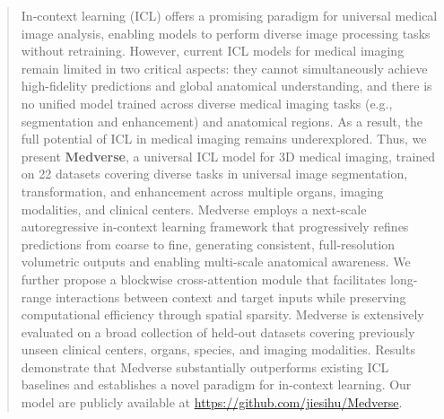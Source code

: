 
\begin{abstract}
In-context learning (ICL) offers a promising paradigm for universal medical image analysis, enabling models to perform diverse image processing tasks without retraining. However, current ICL models for medical imaging remain limited in two critical aspects: they cannot simultaneously achieve high-fidelity predictions and global anatomical understanding, and there is no unified model trained across diverse medical imaging tasks (e.g., segmentation and enhancement) and anatomical regions. As a result, the full potential of ICL in medical imaging remains underexplored. Thus, we present \textbf{Medverse}, a universal ICL model for 3D medical imaging, trained on 22 datasets covering diverse tasks in universal image segmentation, transformation, and enhancement across multiple organs, imaging modalities, and clinical centers. Medverse employs a next-scale autoregressive in-context learning framework that progressively refines predictions from coarse to fine, generating consistent, full-resolution volumetric outputs and enabling multi-scale anatomical awareness. We further propose a blockwise cross-attention module that facilitates long-range interactions between context and target inputs while preserving computational efficiency through spatial sparsity. Medverse is extensively evaluated on a broad collection of held-out datasets covering previously unseen clinical centers, organs, species, and imaging modalities. Results demonstrate that Medverse substantially outperforms existing ICL baselines and establishes a novel paradigm for in-context learning. Our model are publicly available at \url{https://github.com/jiesihu/Medverse}.
\end{abstract}





